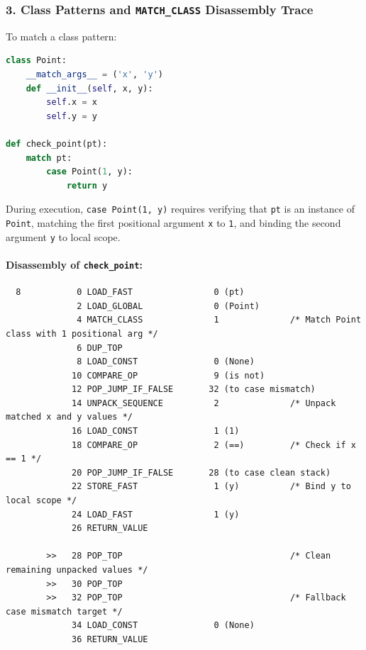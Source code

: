 \hypertarget{class-patterns-and-match_class-disassembly-trace}{%
\subsubsection{\texorpdfstring{3. Class Patterns and
\texttt{MATCH\_CLASS} Disassembly
Trace}{3. Class Patterns and MATCH\_CLASS Disassembly Trace}}\label{class-patterns-and-match_class-disassembly-trace}}

To match a class pattern:

\begin{lstlisting}[language=Python]
class Point:
    __match_args__ = ('x', 'y')
    def __init__(self, x, y):
        self.x = x
        self.y = y

def check_point(pt):
    match pt:
        case Point(1, y):
            return y
\end{lstlisting}

During execution, \passthrough{\lstinline!case Point(1, y)!} requires
verifying that \passthrough{\lstinline!pt!} is an instance of
\passthrough{\lstinline!Point!}, matching the first positional argument
\passthrough{\lstinline!x!} to \passthrough{\lstinline!1!}, and binding
the second argument \passthrough{\lstinline!y!} to local scope.

\hypertarget{disassembly-of-check_point}{%
\paragraph{\texorpdfstring{Disassembly of
\texttt{check\_point}:}{Disassembly of check\_point:}}\label{disassembly-of-check_point}}

\begin{lstlisting}
  8           0 LOAD_FAST                0 (pt)
              2 LOAD_GLOBAL              0 (Point)
              4 MATCH_CLASS              1              /* Match Point class with 1 positional arg */
              6 DUP_TOP
              8 LOAD_CONST               0 (None)
             10 COMPARE_OP               9 (is not)
             12 POP_JUMP_IF_FALSE       32 (to case mismatch)
             14 UNPACK_SEQUENCE          2              /* Unpack matched x and y values */
             16 LOAD_CONST               1 (1)
             18 COMPARE_OP               2 (==)         /* Check if x == 1 */
             20 POP_JUMP_IF_FALSE       28 (to case clean stack)
             22 STORE_FAST               1 (y)          /* Bind y to local scope */
             24 LOAD_FAST                1 (y)
             26 RETURN_VALUE

        >>   28 POP_TOP                                 /* Clean remaining unpacked values */
        >>   30 POP_TOP
        >>   32 POP_TOP                                 /* Fallback case mismatch target */
             34 LOAD_CONST               0 (None)
             36 RETURN_VALUE
\end{lstlisting}

